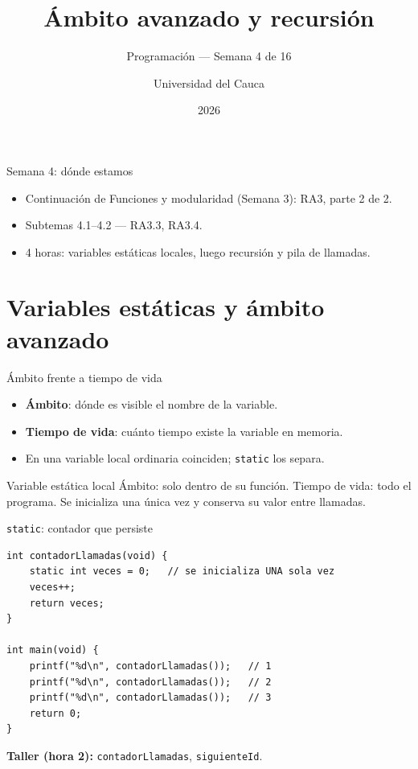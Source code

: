 \documentclass[11pt]{beamer}
\title[Semana 4: Ámbito avanzado y recursión]{Ámbito avanzado y recursión}
\subtitle{Programación --- Semana 4 de 16}
\author{Universidad del Cauca}
\date{2026}
\begin{document}
\begin{frame}
  \titlepage
\end{frame}

\begin{frame}{Semana 4: dónde estamos}
  \begin{itemize}
    \item Continuación de Funciones y modularidad (Semana 3): RA3, parte 2 de 2.
    \item Subtemas 4.1--4.2 --- RA3.3, RA3.4.
    \item 4 horas: variables estáticas locales, luego recursión y pila de llamadas.
  \end{itemize}
  \tableofcontents
\end{frame}

\section{Variables estáticas y ámbito avanzado}

\begin{frame}{Ámbito frente a tiempo de vida}
  \begin{itemize}
    \item \textbf{Ámbito}: dónde es visible el nombre de la variable.
    \item \textbf{Tiempo de vida}: cuánto tiempo existe la variable en memoria.
    \item En una variable local ordinaria coinciden; \texttt{static} los separa.
  \end{itemize}
  \begin{block}{Variable estática local}
    Ámbito: solo dentro de su función. Tiempo de vida: todo el programa. Se inicializa una única
    vez y conserva su valor entre llamadas.
  \end{block}
\end{frame}

\begin{frame}[fragile]{\texttt{static}: contador que persiste}
\begin{lstlisting}
int contadorLlamadas(void) {
    static int veces = 0;   // se inicializa UNA sola vez
    veces++;
    return veces;
}

int main(void) {
    printf("%d\n", contadorLlamadas());   // 1
    printf("%d\n", contadorLlamadas());   // 2
    printf("%d\n", contadorLlamadas());   // 3
    return 0;
}
\end{lstlisting}
  \textbf{Taller (hora 2):} \texttt{contadorLlamadas}, \texttt{siguienteId}.
\end{frame}
\end{document}
